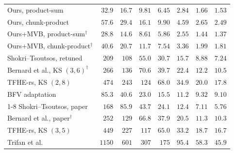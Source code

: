 \begin{table}[p]
\begin{tabular}{@{}lrrrrrrr@{}}
\midrule[0.8pt]
\rowcolor{black!8}\multicolumn{8}{@{}l}{\textbf{$W=256$}} \\
\midrule
Ours, product-sum & $32.9$ & $16.7$ & $9.81$ & $6.45$ & $2.84$ & $1.66$ & $1.53$ \\
Ours, chunk-product & $57.6$ & $29.4$ & $16.1$ & $9.90$ & $4.59$ & $2.65$ & $2.49$ \\
Ours+MVB, product-sum$^\dagger$ & $\mathbf{28.8}$ & $\mathbf{14.6}$ & $\mathbf{8.61}$ & $\mathbf{5.86}$ & $\mathbf{2.55}$ & $\mathbf{1.44}$ & $\mathbf{1.37}$ \\
Ours+MVB, chunk-product$^\dagger$ & $40.6$ & $20.7$ & $11.7$ & $7.54$ & $3.36$ & $1.99$ & $1.81$ \\
Shokri--Tsoutsos, retuned & $209$ & $108$ & $55.0$ & $30.7$ & $15.7$ & $8.88$ & $7.24$ \\
Bernard et al., KS $(3,6)^\dagger$ & $266$ & $136$ & $70.6$ & $39.7$ & $22.4$ & $12.2$ & $10.5$ \\
TFHE-rs, KS $(2,8)$ & $474$ & $243$ & $124$ & $68.0$ & $34.9$ & $20.0$ & $17.8$ \\
BFV adaptation & $85.3$ & $40.6$ & $23.0$ & $15.5$ & $11.2$ & $9.32$ & $9.10$ \\
\cmidrule(l){1-8}
Shokri--Tsoutsos, paper & $168$ & $85.9$ & $43.7$ & $24.1$ & $12.4$ & $7.11$ & $5.76$ \\
Bernard et al., paper$^\dagger$ & $252$ & $129$ & $66.8$ & $37.9$ & $20.5$ & $11.3$ & $10.3$ \\
TFHE-rs, KS $(3,5)$ & $449$ & $227$ & $117$ & $65.0$ & $33.2$ & $18.7$ & $16.7$ \\
Trifan et al. & $1150$ & $601$ & $307$ & $175$ & $95.4$ & $58.3$ & $45.9$ \\
\bottomrule
\end{tabular}
\end{table}
